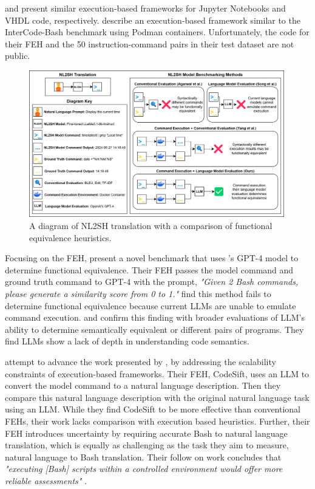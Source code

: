 \documentclass[11pt]{article}
\begin{document}
\citet{ExeDS} and \citet{vhdl} present similar execution-based frameworks for Jupyter Notebooks and VHDL code, respectively. \citet{exec_based_eval} describe an execution-based framework similar to the InterCode-Bash benchmark using Podman containers. Unfortunately, the code for their FEH and the 50 instruction-command pairs in their test dataset are not public.

\begin{figure}[t!]
  \centering
  \includegraphics[width=0.99\textwidth]{figs/icalfa.png}
  \caption{A diagram of NL2SH translation with a comparison of functional equivalence heuristics.}
  \label{fig:icalfa}
\end{figure}

Focusing on the FEH, \citet{tsed} present a novel benchmark that uses \citeauthor{gpt4}'s GPT-4 model to determine functional equivalence. Their FEH passes the model command and ground truth command to GPT-4 with the prompt, \textit{"Given 2 Bash commands, please generate a similarity score from 0 to 1."} \citet{tsed} find this method fails to determine functional equivalence because current LLMs are unable to emulate command execution. \citet{lackunderstanding} and \citet{limitations} confirm this finding with broader evaluations of LLM's ability to determine semantically equivalent or different pairs of programs. They find LLMs show a lack of depth in understanding code semantics.

\citet{codesift} attempt to advance the work presented by \citet{tsed}, by addressing the scalability constraints of execution-based frameworks. Their FEH, CodeSift, uses an LLM to convert the model command to a natural language description. Then they compare this natural language description with the original natural language task using an LLM. While they find CodeSift to be more effective than conventional FEHs, their work lacks comparison with execution based heuristics. Further, their FEH introduces uncertainty by requiring accurate Bash to natural language translation, which is equally as challenging as the task they aim to measure, natural language to Bash translation. Their follow on work concludes that \textit{"executing [Bash] scripts within a controlled environment would offer more reliable assessments"} \cite{scriptsmith}.
\end{document}

